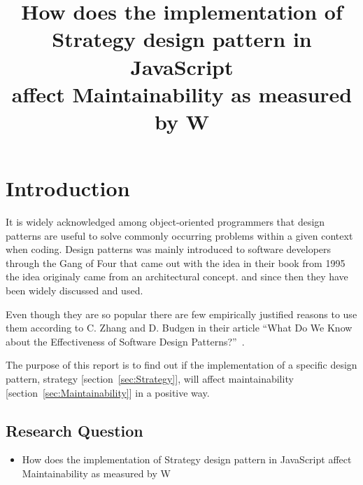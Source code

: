 \documentclass[conference, a4paper]{IEEEtran}
\begin{document}
\title{How does the implementation of\\
Strategy design pattern in JavaScript\\
affect Maintainability as measured by W}
\author{
}

\maketitle

\begin{abstract}
\end{abstract}

\section{Introduction}
\label{sec:Introduction}
It is widely acknowledged among object-oriented programmers that design patterns are useful to solve commonly occurring problems within a given context when coding. Design patterns was mainly introduced to software developers through the Gang of Four that came out with the idea in their book from 1995~\cite{bibitem:GoF} the idea originaly came from an architectural concept. and since then they have been widely discussed and used.

Even though they are so popular there are few empirically justified reasons to use them according to C. Zhang and D. Budgen in their article ``What Do We Know about the Effectiveness of Software Design Patterns?''~\cite{bibitem:Zhang}.

The purpose of this report is to find out if the implementation of a specific design pattern, strategy [section~\ref{sec:Strategy}], will affect maintainability [section~\ref{sec:Maintainability}] in a positive way.
\\
\subsection{Research Question}
\begin{itemize}
	\item How does the implementation of Strategy design pattern in JavaScript affect Maintainability as measured by W
\end{itemize}
\end{document}
